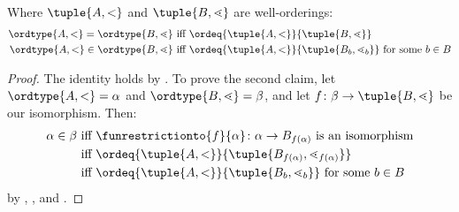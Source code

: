 \documentclass[../../../include/open-logic-section]{subfiles}
\begin{document}
\begin{cor}
Where $\tuple{A, <}$ and $\tuple{B, \lessdot}$ are well-orderings: 
\begin{align*}
	\ordtype{A, <} = \ordtype{B, \lessdot}&\text{ iff }\ordeq{\tuple{A, <}}{\tuple{B, \lessdot}}\\
	\ordtype{A, <} \in \ordtype{B, \lessdot}&\text{ iff }\ordeq{\tuple{A, <}}{\tuple{B_b, \lessdot_b}}\text{ for some }b \in B
\end{align*}
\end{cor}

\begin{proof}
The identity holds by . To prove
the second claim, let $\ordtype{A, <} = \alpha$ and $\ordtype{B,
\lessdot} = \beta$, and let $f \colon \beta \to \tuple {B, \lessdot}$
be our isomorphism. Then:
\begin{align*}
	\alpha \in \beta&\text{ iff }\funrestrictionto{f}{\alpha} \colon \alpha \to B_{f(\alpha)}\text{ is an isomorphism}\\
	&\text{ iff }\ordeq{\tuple{A, <}}{\tuple{B_{f(\alpha)}, \lessdot_{f(\alpha)}}}\\
	&\text{ iff }\ordeq{\tuple{A, <}}{\tuple{B_b, \lessdot_b}}\text{ for some $b \in B$}
\end{align*}
by ,
, and
.
\end{proof}
\end{document}
